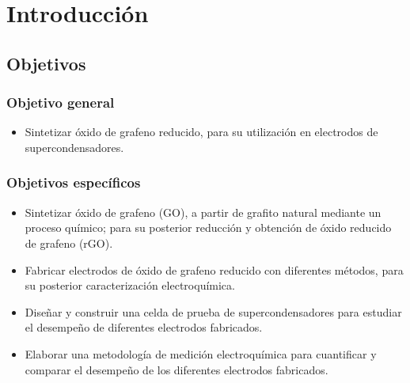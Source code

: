 \chapter*{Introducción}
\section*{Objetivos}
\subsection*{Objetivo general}
\begin{itemize}
	\item Sintetizar óxido de grafeno reducido, para su utilización en electrodos de supercondensadores.
\end{itemize}
\subsection*{Objetivos específicos}
\begin{itemize}
	\item Sintetizar óxido de grafeno (GO), a partir de grafito natural mediante un proceso químico; para su posterior reducción y obtención de óxido reducido de grafeno (rGO).
	\item Fabricar electrodos de óxido de grafeno reducido con diferentes métodos, para su posterior caracterización electroquímica.
	\item Diseñar y construir una celda de prueba de supercondensadores para estudiar el desempeño de diferentes electrodos fabricados.
	\item Elaborar una metodología de medición electroquímica para cuantificar y comparar el desempeño de los diferentes electrodos fabricados. 
\end{itemize}

\newpage
